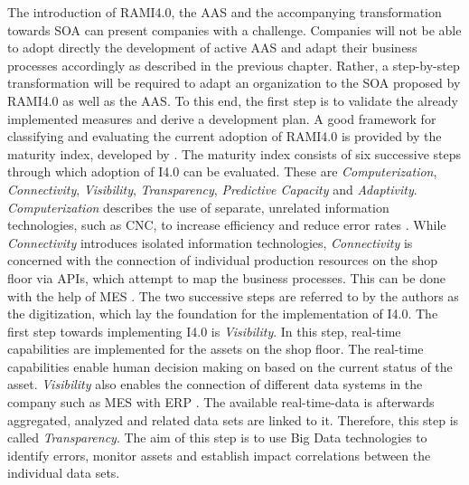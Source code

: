 The introduction of \ac{RAMI4.0}, the \ac{AAS} and the accompanying transformation towards \ac{SOA} can present companies with a challenge. Companies will not be able to adopt directly the development of active \ac{AAS} and adapt their business processes accordingly as described in the previous chapter. Rather, a step-by-step transformation will be required to adapt an organization to the \ac{SOA} proposed by \ac{RAMI4.0} as well as the \ac{AAS}. To this end, the first step is to validate the already implemented measures and derive a development plan. A good framework for classifying and evaluating the current adoption of \ac{RAMI4.0} is provided by the maturity index, developed by \cite[p. 15]{Schuh2020IndustrieAcatech}. The maturity index consists of six successive steps through which adoption of \ac{I4.0} can be evaluated. These are \textit{Computerization}, \textit{Connectivity}, \textit{Visibility}, \textit{Transparency}, \textit{Predictive Capacity} and \textit{Adaptivity}. \textit{Computerization} describes the use of separate, unrelated information technologies, such as \ac{CNC}, to increase efficiency and reduce error rates \cite[p. 15]{Schuh2020IndustrieAcatech}. While \textit{Connectivity} introduces isolated information technologies, \textit{Connectivity} is concerned with the connection of individual production resources on the shop floor via \ac{API}s, which attempt to map the business processes. This can be done with the help of \ac{MES} \cite[p. 16]{Schuh2020IndustrieAcatech}. The two successive steps are referred to by the authors as the digitization, which lay the foundation for the implementation of \ac{I4.0}. The first step towards implementing \ac{I4.0} is \textit{Visibility}. In this step, real-time capabilities are implemented for the assets on the shop floor. The real-time capabilities enable human decision making on based on the current status of the asset. \textit{Visibility} also enables the connection of different data systems in the company such as \ac{MES} with \ac{ERP} \cite[p. 17]{Schuh2020IndustrieAcatech}. The available real-time-data is afterwards aggregated, analyzed and related data sets are linked to it. Therefore, this step is called \textit{Transparency}. The aim of this step is to use Big Data technologies to identify errors, monitor assets and establish impact correlations between the individual data sets.